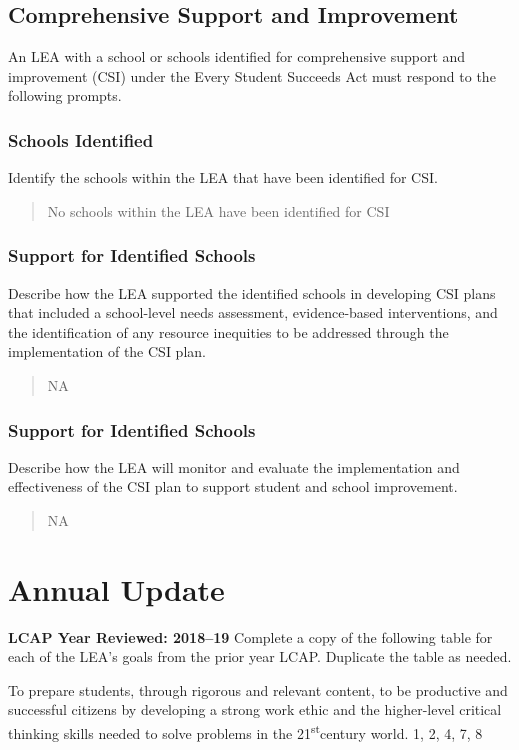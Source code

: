 \documentclass{article}
\newcommand{\st}{\textsuperscript{st}}
\newcounter{goal}[section] %
\begin{document}
\subsection{Comprehensive Support and Improvement}
An LEA with a school or schools identified for comprehensive support and improvement (CSI) under the Every Student Succeeds Act must respond to the following prompts.

\subsubsection{Schools Identified}
Identify the schools within the LEA that have been identified for CSI.
\begin{quotation}
	No schools within the LEA have been identified for CSI
\end{quotation}

\subsubsection{Support for Identified Schools}
Describe how the LEA supported the identified schools in developing CSI plans that included a school-level needs assessment, evidence-based interventions, and the identification of any resource inequities to be addressed through the implementation of the CSI plan.
\begin{quotation}
	NA
\end{quotation}

\subsubsection{Support for Identified Schools}
Describe how the LEA will monitor and evaluate the implementation and effectiveness of the CSI plan to support student and school improvement.
\begin{quotation}
	NA
\end{quotation}

\section{Annual Update}
{\bf LCAP Year Reviewed: 2018--19}\newline
Complete a copy of the following table for each of the LEA's goals from the prior year LCAP. Duplicate the table as needed.

\Goal %
	{To prepare students, through rigorous and relevant content, to be productive and successful citizens by developing a strong work ethic and the higher-level critical thinking skills needed to solve problems in the 21\st century world.}
	{1, 2, 4, 7, 8}
	{}
\end{document}
